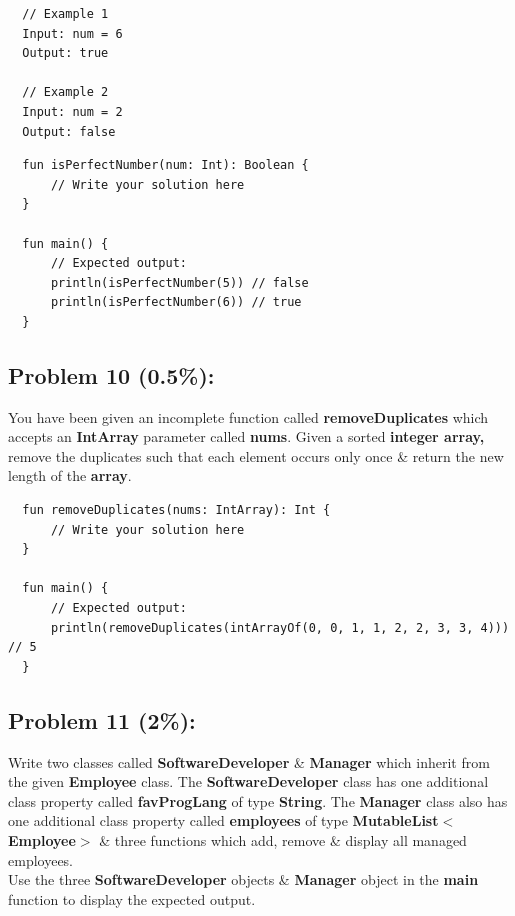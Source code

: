 \documentclass{article}
\begin{document}
\begin{verbatim}
  // Example 1
  Input: num = 6
  Output: true

  // Example 2
  Input: num = 2
  Output: false
\end{verbatim}

\begin{verbatim}
  fun isPerfectNumber(num: Int): Boolean {
      // Write your solution here
  }

  fun main() {
      // Expected output:
      println(isPerfectNumber(5)) // false
      println(isPerfectNumber(6)) // true
  }
\end{verbatim}

\subsection*{Problem 10 (0.5\%):}
You have been given an incomplete function called \textbf{removeDuplicates} which accepts an \textbf{IntArray} parameter called \textbf{nums}. Given a sorted \textbf{integer array,} remove the duplicates such that each element occurs only once \& return the new length of the \textbf{array}.

\begin{verbatim}
  fun removeDuplicates(nums: IntArray): Int {
      // Write your solution here  
  }

  fun main() {
      // Expected output:
      println(removeDuplicates(intArrayOf(0, 0, 1, 1, 2, 2, 3, 3, 4))) // 5
  }
\end{verbatim}

\subsection*{Problem 11 (2\%):}
Write two classes called \textbf{SoftwareDeveloper} \& \textbf{Manager} which inherit from the given \textbf{Employee} class. The \textbf{SoftwareDeveloper} class has one additional class property called \textbf{favProgLang} of type \textbf{String}. The \textbf{Manager} class also has one additional class property called \textbf{employees} of type \textbf{MutableList$<$Employee$>$} \& three functions which add, remove \& display all managed employees. \\

Use the three \textbf{SoftwareDeveloper} objects \& \textbf{Manager} object in the \textbf{main} function to display the expected output.
\end{document}
